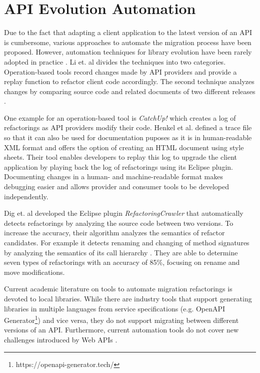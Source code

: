 \section{API Evolution Automation}
\label{sec:APIEvolutionAutomation}

Due to the fact that adapting a client application to the latest version of an API is cumbersome, various approaches to automate the migration process have been proposed. However, automation techniques for library evolution have been rarely adopted in practice \cite[p. 300]{li_how_2013}. Li et. al divides the techniques into two categories. Operation-based tools record changes made by API providers and provide a replay function to refactor client code accordingly. The second technique analyzes changes by comparing source code and related documents of two different releases \cite[p. 306]{li_how_2013}. 

One example for an operation-based tool is \textit{CatchUp!} \cite{henkel_catchup!_2005} which creates a log of refactorings as API providers modify their code. Henkel et al. defined a trace file so that it can also be used for documentation puposes as it is in human-readable XML format and offers the option of creating an HTML document using style sheets. Their tool enables developers to replay this log to upgrade the client application by playing back the log of refactorings using its Eclipse plugin. Documenting changes in a human- and machine-readable format makes debugging easier and allows provider and consumer tools to be developed independently.

Dig et. al \cite{hutchison_automated_2006} developed the Eclipse plugin \textit{RefactoringCrawler} that automatically
detects refactorings by analyzing the source code between two versions. To increase the accuracy, their algorithm analyzes the semantics of refactor candidates. For example it detects renaming and changing of method signatures by analyzing the semantics of its call hierarchy \cite{hutchison_automated_2006}. They are able to determine seven types of refactorings with an accuracy of 85\%, focusing on rename and move modifications. 

Current academic literature on tools to automate migration refactorings is devoted to local libraries. While there are industry tools that support generating libraries in multiple languages from service specifications (e.g. OpenAPI Generator\footnote{https://openapi-generator.tech/}) and vice versa, they do not support migrating between different versions of an API. Furthermore, current automation tools do not cover new challenges introduced by Web APIs \cite[p. 306]{li_how_2013}.